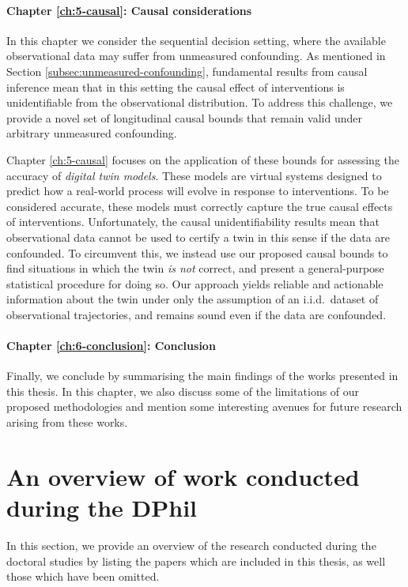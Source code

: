 \paragraph*{Chapter \ref*{ch:5-causal}: Causal considerations \citep{cornish2023causalfalsificationdigitaltwins}}
In this chapter we consider the sequential decision setting, where the available observational data may suffer from unmeasured confounding. 
As mentioned in Section \ref{subsec:unmeasured-confounding}, fundamental results from causal inference mean that in this setting the causal effect of interventions is unidentifiable from the observational distribution.  
To address this challenge, we provide a novel set of longitudinal causal bounds that remain valid under arbitrary unmeasured confounding.

Chapter \ref*{ch:5-causal} focuses on the application of these 
bounds for assessing the accuracy of \emph{digital twin models}.
These models are virtual systems designed to predict how a real-world process will evolve in response to interventions. 
To be considered accurate, these models must correctly capture the true causal effects of interventions.
Unfortunately, the causal unidentifiability results mean that observational data cannot be used to certify a twin in this sense if the data are confounded.
To circumvent this, we instead use our proposed causal bounds to find situations in which the twin \emph{is not} correct, and present a general-purpose statistical procedure for doing so.
Our approach yields reliable and actionable information about the twin under only the assumption of an i.i.d.\ dataset of observational trajectories, and remains sound even if the data are confounded.


\paragraph*{Chapter \ref*{ch:6-conclusion}: Conclusion} 
Finally, we conclude by summarising the main findings of the works presented in this thesis. 
In this chapter, we also discuss some of the limitations of our proposed methodologies and mention some interesting avenues for future research arising from these works. 

\section{An overview of work conducted during the DPhil}
In this section, we provide an overview of the research conducted during the doctoral studies by listing the papers which are included in this thesis, as well those which have been omitted.

